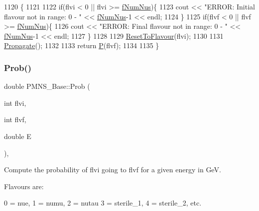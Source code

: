 \begin{DoxyCode}
1120 \{
1121 
1122   \textcolor{keywordflow}{if}(flvi < 0 || flvi >= \hyperlink{classOscProb_1_1PMNS__Base_a24bb74bed63569dfe88b18fa6a08060e}{fNumNus})\{
1123     cout << \textcolor{stringliteral}{"ERROR: Initial flavour not in range: 0 - "} << \hyperlink{classOscProb_1_1PMNS__Base_a24bb74bed63569dfe88b18fa6a08060e}{fNumNus}-1 << endl;
1124   \}
1125   \textcolor{keywordflow}{if}(flvf < 0 || flvf >= \hyperlink{classOscProb_1_1PMNS__Base_a24bb74bed63569dfe88b18fa6a08060e}{fNumNus})\{
1126     cout << \textcolor{stringliteral}{"ERROR: Final flavour not in range: 0 - "} << \hyperlink{classOscProb_1_1PMNS__Base_a24bb74bed63569dfe88b18fa6a08060e}{fNumNus}-1 << endl;
1127   \}
1128 
1129   \hyperlink{classOscProb_1_1PMNS__Base_ac0d4bf8ff1318ef96d3dafa62e0cec25}{ResetToFlavour}(flvi);
1130 
1131   \hyperlink{classOscProb_1_1PMNS__Base_a054e3a8b05b9a958b6fa416e4a835e3e}{Propagate}();
1132 
1133   \textcolor{keywordflow}{return} \hyperlink{classOscProb_1_1PMNS__Base_a0dc4d45bc3d7e03b9abbf5b4e100cc22}{P}(flvf);
1134 
1135 \}
\end{DoxyCode}
\mbox{\label{classOscProb_1_1PMNS__Base_aa3cee10639d5c0879ccb9e78d62128d3}} 
\subsubsection{\texorpdfstring{Prob()}{Prob()}\hspace{0.1cm}{\footnotesize\ttfamily [2/3]}}
{\footnotesize\ttfamily double P\+M\+N\+S\+\_\+\+Base\+::\+Prob (\begin{DoxyParamCaption}\item[{int}]{flvi,  }\item[{int}]{flvf,  }\item[{double}]{E }\end{DoxyParamCaption})\hspace{0.3cm}{\ttfamily [virtual]}, {\ttfamily [inherited]}}

Compute the probability of flvi going to flvf for a given energy in GeV.

Flavours are\+: 
\begin{DoxyPre}
  0 = nue, 1 = numu, 2 = nutau
  3 = sterile\_1, 4 = sterile\_2, etc.
\end{DoxyPre}
 
